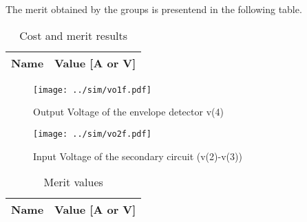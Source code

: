 \par The merit obtained by the groups is presentend in the following table.

\begin{table}[!ht]
  \centering
  \begin{tabular}{|l|r|}
    \hline    
    {\bf Name} & {\bf Value [A or V]} \\ \hline
    
  \end{tabular}
  \caption{Cost and merit results}
  \label{tab:ngs1}
\end{table}


\begin{figure}[ht!] \centering
\texttt{[image: ../sim/vo1f.pdf]}
\caption{Output Voltage of the envelope detector v(4)} 
\label{fig:sim1}
\end{figure}

\begin{figure}[ht!] \centering
\texttt{[image: ../sim/vo2f.pdf]}
\caption{Input Voltage of the secondary circuit (v(2)-v(3))} 
\label{fig:sim2}
\end{figure}

\begin{table}[!ht]
  \centering
  \begin{tabular}{|l|r|}
    \hline    
    {\bf Name} & {\bf Value [A or V]} \\ \hline
    
  \end{tabular}
  \caption{Merit values}
  \label{tab:ng5}
\end{table}


